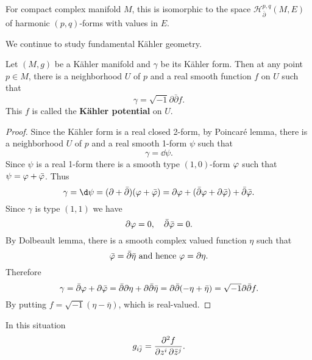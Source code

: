 \documentclass[12pt]{article}
\begin{document}
For compact complex manifold \(M\), this is isomorphic to the space \(\mathcal{H}^{p,q}
_{\bar{\partial}}(M,E)\) of harmonic \((p,q)\)-forms with values in \(E\).

We continue to study fundamental K\"ahler geometry.
\begin{prop}
  Let \((M,g)\) be a K\"ahler manifold and \(\gamma\) be its K\"ahler form. Then at
  any point \(p\in M\), there is a neighborhood \(U\) of \(p\) and a real smooth
  function \(f\) on \(U\) such that \[
    \gamma=\sqrt{-1}\partial\bar{\partial}f
  .\] This \(f\) is called the \textbf{K\"ahler potential} on \(U\).
\end{prop}
\begin{proof}
  Since the K\"ahler form is a real closed 2-form, by Poincaré lemma, there is a
  neighborhood \(U\) of \(p\) and a real smooth 1-form \(\psi\) such that \[
    \gamma=\dd{\psi}
  .\] Since \(\psi\) is a real 1-form there is a smooth type \((1,0)\)-form \(\varphi\)
  such that \(\psi=\varphi+\bar{\varphi}\). Thus \[
    \gamma=\dd{\psi}=(\partial +\bar{\partial})(\vphi+\bar{\vphi})=
    \partial\vphi+(\bar{\partial}\vphi+\partial\bar{\vphi})+\bar{\partial}\bar{\vphi}
  .\] Since \(\gamma\) is type \((1,1)\) we have \[
    \partial\varphi=0,\quad\bar{\partial}\bar{\varphi}=0
  .\] By Dolbeault lemma, there is a smooth complex valued function \(\eta\)
  such that \[
    \bar{\varphi}=\bar{\partial}\bar{\eta}\text{ and hence }\varphi=\partial\eta
  .\] Therefore \[
    \gamma=\bar{\partial}\varphi+\partial\bar{\varphi}=\bar{\partial}\partial\eta
    +\partial\bar{\partial}\bar{\eta}=\partial\bar{\partial}(-\eta+\bar{\eta})
    =\sqrt{-1}\partial\bar{\partial}f
  .\] By putting \(f=\sqrt{-1}(\eta-\bar{\eta})\), which is real-valued.
\end{proof}
\begin{remark}
  In this situation \[
    g_{i\bar{j}}=\pdv{f}{z^i,\bar{z}^j}
  .\]
\end{remark}
\end{document}
